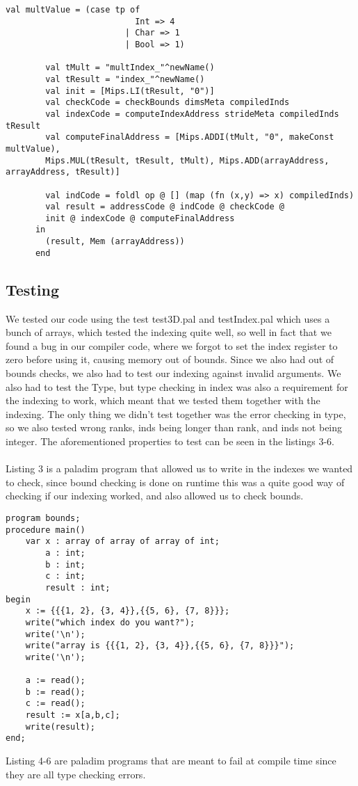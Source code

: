 \begin{lstlisting}[style=MLStyle, caption=Implementation of indexing for the compiler]
        val multValue = (case tp of
                          Int => 4
                        | Char => 1
                        | Bool => 1)
                          
        val tMult = "multIndex_"^newName()
        val tResult = "index_"^newName()
        val init = [Mips.LI(tResult, "0")]
        val checkCode = checkBounds dimsMeta compiledInds 
        val indexCode = computeIndexAddress strideMeta compiledInds tResult 
        val computeFinalAddress = [Mips.ADDI(tMult, "0", makeConst multValue),
        Mips.MUL(tResult, tResult, tMult), Mips.ADD(arrayAddress, arrayAddress, tResult)] 
  
        val indCode = foldl op @ [] (map (fn (x,y) => x) compiledInds)
        val result = addressCode @ indCode @ checkCode @ 
        init @ indexCode @ computeFinalAddress 
      in
        (result, Mem (arrayAddress)) 
      end	
\end{lstlisting}



\subsection{Testing}
We tested our code using the test test3D.pal and testIndex.pal which uses a bunch of arrays, which tested the indexing quite well, 
so well in fact that we found a bug in our compiler code, where we forgot to set the index register to zero before using it, 
causing memory out of bounds. Since we also had out of bounds checks, we also had to test our indexing against invalid arguments. 
We also had to test the Type, but type checking in index was also a requirement for the indexing to work, 
which meant that we tested them together with the indexing. The only thing we didn't test together was the error checking in type, 
so we also tested wrong ranks, inds being longer than rank, and inds not being integer. The aforementioned properties to test can be
seen in the listings 3-6.
\\
\\
Listing 3 is a paladim program that allowed us to write in the indexes we wanted to check, since bound checking is done on runtime this was
a quite good way of checking if our indexing worked, and also allowed us to check bounds.

\begin{lstlisting}[style=paladim, caption=testIndexBounds.pal tests bounds]
program bounds;
procedure main()
    var x : array of array of array of int;
        a : int;
        b : int;
        c : int;
        result : int;
begin
    x := {{{1, 2}, {3, 4}},{{5, 6}, {7, 8}}};
    write("which index do you want?");
    write('\n');
    write("array is {{{1, 2}, {3, 4}},{{5, 6}, {7, 8}}}");
    write('\n');

    a := read();
    b := read();
    c := read();
    result := x[a,b,c];
    write(result);
end;
\end{lstlisting}
Listing 4-6 are paladim programs that are meant to fail at compile time since they are all type checking errors.


